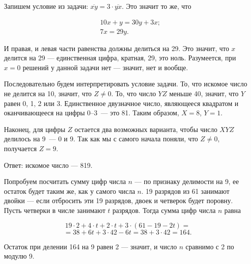 ﻿
\begin{itemize}

\itA Запишем условие из задачи: $\overline{xy} = 3 \cdot \overline{yx}$. Это значит то же, что

\vspace{-0.4cm}
\begin{align*}
& 10x + y = 30y + 3x; \\
& 7x = 29y.
\end{align*}

И правая, и левая части равенства должны делиться на 29. Это значит, что $x$ делится на 29 — единственная цифра, кратная, 29, это ноль. Разумеется, при $x=0$ решений у данной задачи нет — значит, нет и вообще.


\itB Последовательно будем интерпретировать условие задачи. То, что искомое число не делится на 10, значит, что $Z \ne 0$. То, что число $YZ$ меньше 40, значит, что $Y$ равен 0, 1, 2 или 3. Единственное двузначное число, являющееся квадратом и оканчивающееся на цифры 0–3~— это 81. Таким образом, $X=8$, $Y=1$.

Наконец, для цифры $Z$ остается два возможных варианта, чтобы число $XYZ$ делилось на 9~— 0 и 9. Так как мы с самого начала поняли, что $Z \ne 0$, получается $Z = 9$.

Ответ: искомое число — 819.

\itC Попробуем посчитать сумму цифр числа $n$ — по признаку делимости на 9, ее остаток будет таким же, как у самого числа $n$. 19 разрядов из 61 занимают двойки — если отбросить эти 19 разрядов, двоек и четверок будет поровну. Пусть четверки в числе занимают $t$ разрядов. Тогда сумма цифр числа $n$ равна

\vspace{-0.4cm}
$$19 \cdot 2 + 4 \cdot t + 2 \cdot t + 3 \cdot (61 - 19 - 2t) =$$
$$= 38 + 6t + 3 \cdot 42 - 6t = 38 + 3 \cdot 42 = 164.$$

Остаток при делении 164 на 9 равен 2 — значит, и число $n$ сравнимо с 2 по модулю 9.

\end{itemize}